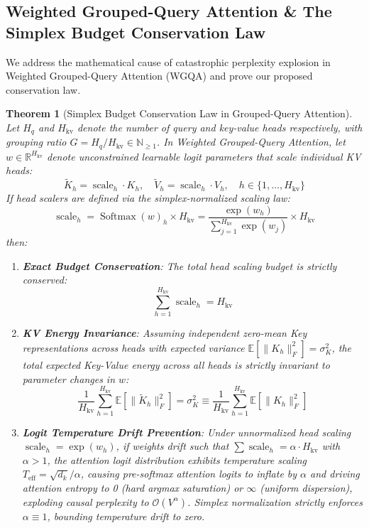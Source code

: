 \documentclass{article}
\newtheorem{theorem}{Theorem}
\begin{document}
\subsection{Weighted Grouped-Query Attention \& The Simplex Budget Conservation Law}
We address the mathematical cause of catastrophic perplexity explosion in Weighted Grouped-Query Attention (WGQA) and prove our proposed conservation law.

\begin{theorem}[Simplex Budget Conservation Law in Grouped-Query Attention]
\label{thm:simplex_conservation}
Let $H_q$ and $H_{\text{kv}}$ denote the number of query and key-value heads respectively, with grouping ratio $G = H_q / H_{\text{kv}} \in \mathbb{N}_{\ge 1}$. In Weighted Grouped-Query Attention, let $w \in \mathbb{R}^{H_{\text{kv}}}$ denote unconstrained learnable logit parameters that scale individual KV heads:
\begin{equation}
    \tilde{K}_h = \operatorname{scale}_h \cdot K_h, \quad \tilde{V}_h = \operatorname{scale}_h \cdot V_h, \quad h \in \{1, \dots, H_{\text{kv}}\}
\end{equation}
If head scalers are defined via the simplex-normalized scaling law:
\begin{equation}
    \operatorname{scale}_h = \operatorname{Softmax}(w)_h \times H_{\text{kv}} = \frac{\exp(w_h)}{\sum_{j=1}^{H_{\text{kv}}} \exp(w_j)} \times H_{\text{kv}}
\end{equation}
then:
\begin{enumerate}
    \item \textbf{Exact Budget Conservation}: The total head scaling budget is strictly conserved:
    \begin{equation}
        \sum_{h=1}^{H_{\text{kv}}} \operatorname{scale}_h = H_{\text{kv}}
    \end{equation}
    \item \textbf{KV Energy Invariance}: Assuming independent zero-mean Key representations across heads with expected variance $\mathbb{E}[\|K_h\|_F^2] = \sigma_K^2$, the total expected Key-Value energy across all heads is strictly invariant to parameter changes in $w$:
    \begin{equation}
        \frac{1}{H_{\text{kv}}} \sum_{h=1}^{H_{\text{kv}}} \mathbb{E}\left[\|\tilde{K}_h\|_F^2\right] = \sigma_K^2 \equiv \frac{1}{H_{\text{kv}}} \sum_{h=1}^{H_{\text{kv}}} \mathbb{E}\left[\|K_h\|_F^2\right]
    \end{equation}
    \item \textbf{Logit Temperature Drift Prevention}: Under unnormalized head scaling $\operatorname{scale}_h = \exp(w_h)$, if weights drift such that $\sum \operatorname{scale}_h = \alpha \cdot H_{\text{kv}}$ with $\alpha > 1$, the attention logit distribution exhibits temperature scaling $T_{\text{eff}} = \sqrt{d_k} / \alpha$, causing pre-softmax attention logits to inflate by $\alpha$ and driving attention entropy to 0 (hard argmax saturation) or $\infty$ (uniform dispersion), exploding causal perplexity to $\mathcal{O}(V^{\alpha})$. Simplex normalization strictly enforces $\alpha \equiv 1$, bounding temperature drift to zero.
\end{enumerate}
\end{theorem}
\end{document}
